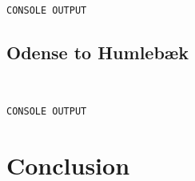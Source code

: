 \begin{lstlisting}


CONSOLE OUTPUT

\end{lstlisting}

\subsection{Odense to Humlebæk}

\begin{lstlisting}


CONSOLE OUTPUT

\end{lstlisting}



\section{Conclusion}


